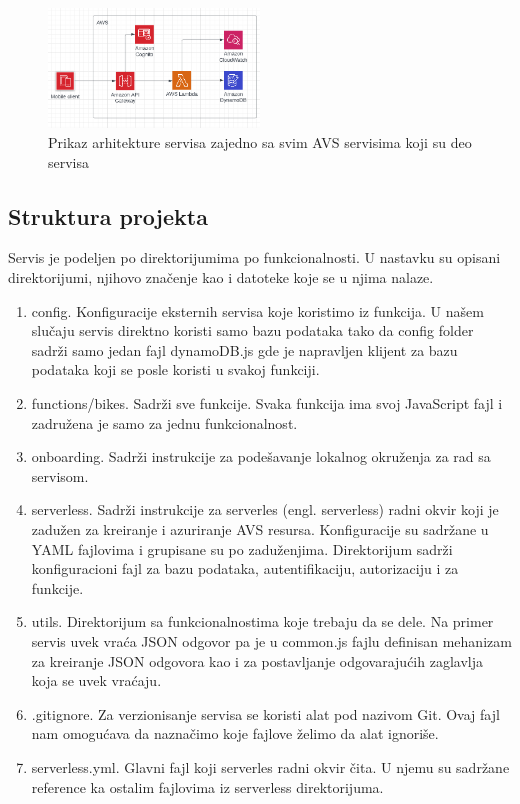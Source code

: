 \documentclass[12pt,oneside]{memoir}
\begin{document}
\begin{figure}[!ht]
  \centering
  \includegraphics[width=0.5\textwidth]{AWS-Architecture-Overview.PNG}
  \caption{Prikaz arhitekture servisa zajedno sa svim AVS servisima koji su deo servisa}
  \label{fig:awsArchitecture}
\end{figure}


\subsection{Struktura projekta}
Servis je podeljen po direktorijumima po funkcionalnosti. U nastavku su opisani direktorijumi, njihovo značenje kao i datoteke koje se u njima nalaze.

\begin{enumerate}
  \item config. Konfiguracije eksternih servisa koje koristimo iz funkcija. U našem slučaju servis direktno koristi samo bazu podataka tako da config folder sadrži samo jedan fajl dynamoDB.js gde je napravljen klijent za bazu podataka koji se posle koristi u svakoj funkciji.
  \item functions/bikes. Sadrži sve funkcije. Svaka funkcija ima svoj JavaScript fajl i zadružena je samo za jednu funkcionalnost. 
  \item onboarding. Sadrži instrukcije za podešavanje lokalnog okruženja za rad sa servisom.
  \item serverless. Sadrži instrukcije za serverles (engl. serverless) radni okvir koji je zadužen za kreiranje i azuriranje AVS resursa. Konfiguracije su sadržane u YAML fajlovima i grupisane su po zaduženjima. Direktorijum sadrži konfiguracioni fajl za bazu podataka, autentifikaciju, autorizaciju i za funkcije.
  \item utils. Direktorijum sa funkcionalnostima koje trebaju da se dele. Na primer servis uvek vraća JSON odgovor pa je u common.js fajlu definisan mehanizam za kreiranje JSON odgovora kao i za postavljanje odgovarajućih zaglavlja koja se uvek vraćaju.
  \item .gitignore. Za verzionisanje servisa se koristi alat pod nazivom Git. Ovaj fajl nam omogućava da naznačimo koje fajlove želimo da alat ignoriše.
  \item serverless.yml. Glavni fajl koji serverles radni okvir čita. U njemu su sadržane reference ka ostalim fajlovima iz serverless direktorijuma.
\end{enumerate}
\end{document}
